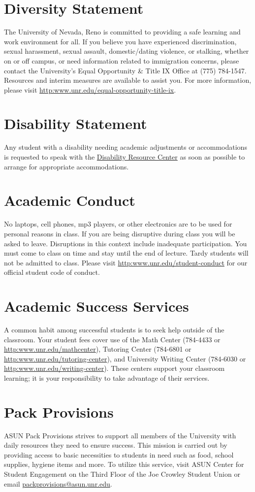 \documentclass[11pt,onecolumn]{article}
\begin{document}
\section*{Diversity Statement}
The University of Nevada, Reno is committed to providing a safe learning and work environment for all. If you believe you have experienced discrimination, sexual harassment, sexual assault, domestic/dating violence, or stalking, whether on or off campus, or need information related to immigration concerns, please contact the University’s Equal Opportunity \& Title IX Office at (775) 784-1547. Resources and interim measures are available to assist you. For more information, please visit \url{http:www.unr.edu/equal-opportunity-title-ix}.

\section*{Disability Statement}
Any student with a disability needing academic adjustments or accommodations is requested to speak with the \href{http:www.unr.edu/drc}{Disability Resource Center} as soon as possible to arrange for appropriate accommodations.

\section*{Academic Conduct}
No laptops, cell phones, mp3 players, or other electronics are to be used for personal reasons in class. If you are being disruptive during class you will be asked to leave. Disruptions in this context include inadequate participation. You must come to class on time and stay until the end of lecture. Tardy students will not be admitted to class. Please visit \url{http:www.unr.edu/student-conduct} for our official student code of conduct.

\section*{Academic Success Services}
A common habit among successful students is to seek help outside of the classroom. Your student fees cover use of the Math Center (784-4433 or \url{http:www.unr.edu/mathcenter}), Tutoring Center (784-6801 or \url{http:www.unr.edu/tutoring-center}), and University Writing Center (784-6030 or \url{http:www.unr.edu/writing-center}). These centers support your classroom learning; it is your responsibility to take advantage of their services.

\section*{Pack Provisions}
ASUN Pack Provisions strives to support all members of the University with daily resources they need to ensure success. This mission is carried out by providing access to basic necessities to students in need such as food, school supplies, hygiene items and more. To utilize this service, visit ASUN Center for Student Engagement on the Third Floor of the Joe Crowley Student Union or email \href{mailto:packprovisions@asun.unr.edu}{packprovisions@asun.unr.edu}.
\end{document}
